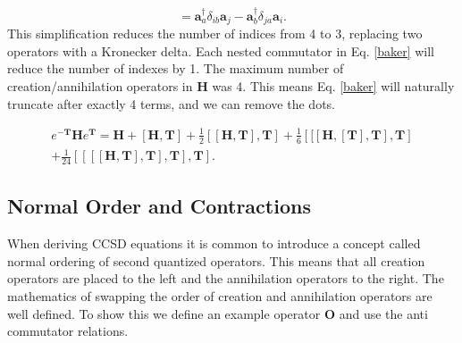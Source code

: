 \begin{equation}
[\textbf{a}^{\dag}_a  \textbf{a}_i 
, \textbf{a}^{\dag}_b \textbf{a}_j] =
\textbf{a}^{\dag}_a  \delta_{ib} \textbf{a}_j
- \textbf{a}^{\dag}_b \delta_{ja} \textbf{a}_i .
\end{equation}
This simplification reduces the number of indices from 4 to 3, replacing two operators with a Kronecker delta. Each nested commutator in Eq. \eqref{baker} will reduce the number of indexes by 1. The maximum number of creation/annihilation operators in $\textbf{H}$ was 4. This means Eq. \eqref{baker} will naturally truncate after exactly 4 terms, and we can remove the dots.

\begin{equation}
\begin{split}
e^{-\textbf{T}} \textbf{H} e^{\textbf{T}} = 
\textbf{H} 
+ \left[ \textbf{H}, \textbf{T} \right] 
+ \frac{1}{2} \left[ [\textbf{H}, \textbf{T}], \textbf{T} \right] 
+ \frac{1}{6} \left[ [ [ \textbf{H},[\textbf{T}], \textbf{T}], \textbf{T} \right] \\
+ \frac{1}{24} \left[ [ [ [\textbf{H}, \textbf{T}], \textbf{T}], \textbf{T}], \textbf{T}  \right] .
\end{split}  \label{variationalccsd}
\end{equation}

\subsection{Normal Order and Contractions}
When deriving CCSD equations it is common to introduce a concept called normal ordering of second quantized operators. This means that all creation operators are placed to the left and the annihilation operators to the right. The mathematics of swapping the order of creation and annihilation operators are well defined. To show this we define an example operator $\textbf{O}$ and use the anti commutator relations.

